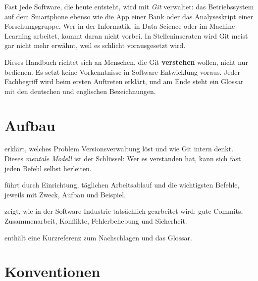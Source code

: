 
Fast jede Software, die heute entsteht, wird mit \emph{Git} verwaltet: das Betriebssystem
auf dem Smartphone ebenso wie die App einer Bank oder das Analyseskript einer
Forschungsgruppe. Wer in der Informatik, in Data Science oder im Machine Learning arbeitet,
kommt daran nicht vorbei. In Stelleninseraten wird Git meist gar nicht mehr erwähnt, weil
es schlicht vorausgesetzt wird.

Dieses Handbuch richtet sich an Menschen, die Git \textbf{verstehen} wollen, nicht nur
bedienen. Es setzt keine Vorkenntnisse in Software-Entwicklung voraus. Jeder Fachbegriff
wird beim ersten Auftreten erklärt, und am Ende steht ein Glossar mit den deutschen und
englischen Bezeichnungen.

\section*{Aufbau}

\begin{description}[style=nextline, leftmargin=1.2cm]
  \item[Teil I: Grundlagen] erklärt, welches Problem Versionsverwaltung löst und wie Git
    intern denkt. Dieses \emph{mentale Modell} ist der Schlüssel: Wer es verstanden hat,
    kann sich fast jeden Befehl selbst herleiten.
  \item[Teil II: Arbeiten mit Git] führt durch Einrichtung, täglichen Arbeitsablauf und die
    wichtigsten Befehle, jeweils mit Zweck, Aufbau und Beispiel.
  \item[Teil III: Praxis] zeigt, wie in der Software-Industrie tatsächlich gearbeitet wird:
    gute Commits, Zusammenarbeit, Konflikte, Fehlerbehebung und Sicherheit.
  \item[Anhang] enthält eine Kurzreferenz zum Nachschlagen und das Glossar.
\end{description}

\section*{Konventionen}

